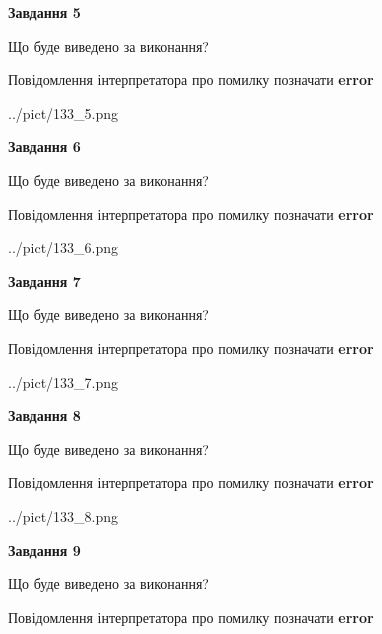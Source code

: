 \documentclass[11pt, ukrainian]{article}
\begin{document}
{\begin {large}
{\begin {center}\textbf{Завдання 5}\end {center}}\par
Що буде виведено за виконання? \par
Повідомлення інтерпретатора про помилку позначати \textbf{error}

\begin{center}
	{../pict/133_5.png}
\end{center}
\newpage

{\begin {center}\textbf{Завдання 6}\end {center}}\par
Що буде виведено за виконання? \par
Повідомлення інтерпретатора про помилку позначати \textbf{error}

\begin{center}
	{../pict/133_6.png}
\end{center}
\newpage

{\begin {center}\textbf{Завдання 7}\end {center}}\par
Що буде виведено за виконання? \par
Повідомлення інтерпретатора про помилку позначати \textbf{error}

\begin{center}
	{../pict/133_7.png}
\end{center}
\newpage

{\begin {center}\textbf{Завдання 8}\end {center}}\par
Що буде виведено за виконання? \par
Повідомлення інтерпретатора про помилку позначати \textbf{error}

\begin{center}
	{../pict/133_8.png}
\end{center}
\newpage

{\begin {center}\textbf{Завдання 9}\end {center}}\par
Що буде виведено за виконання? \par
Повідомлення інтерпретатора про помилку позначати \textbf{error}


\end{large}}
\end{document}
